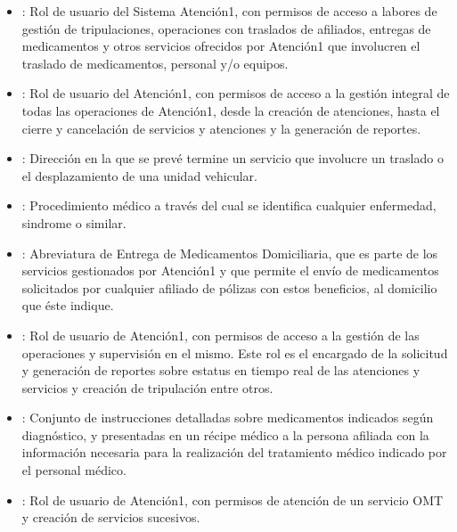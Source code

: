 \documentclass[letterpaper,10pt,spanish]{sphinxmanual}
\begin{document}
\begin{itemize}
\item {} 
: Rol de usuario del Sistema Atención\sphinxhyphen{}1, con permisos de acceso a labores de gestión de tripulaciones, operaciones con traslados de afiliados, entregas de medicamentos y otros servicios ofrecidos por Atención\sphinxhyphen{}1 que involucren el traslado de medicamentos, personal y/o equipos.

\item {} 
: Rol de usuario del Atención\sphinxhyphen{}1, con permisos de acceso a la gestión integral de todas las operaciones de Atención\sphinxhyphen{}1, desde la creación de atenciones, hasta el cierre y cancelación de servicios y atenciones y la generación de reportes.

\item {} 
: Dirección en la que se prevé termine un servicio que involucre un traslado o el desplazamiento de una unidad vehicular.

\item {} 
: Procedimiento médico a través del cual se identifica cualquier enfermedad, sindrome o similar.

\item {} 
: Abreviatura de Entrega de Medicamentos Domiciliaria, que es parte de los servicios gestionados por Atención\sphinxhyphen{}1 y que permite el envío de medicamentos solicitados por cualquier afiliado de pólizas con estos beneficios, al domicilio que éste indique.

\item {} 
: Rol de usuario de Atención\sphinxhyphen{}1, con permisos de acceso a la gestión de las operaciones y supervisión en el mismo. Este rol es el encargado de la solicitud y generación de reportes sobre estatus en tiempo real de las atenciones y servicios y creación de tripulación entre otros.

\item {} 
: Conjunto de instrucciones detalladas sobre medicamentos indicados según diagnóstico, y presentadas en un récipe médico a la persona afiliada con la información necesaria para la realización del tratamiento médico indicado por el personal médico.

\item {} 
: Rol de usuario de Atención\sphinxhyphen{}1, con permisos de atención de un servicio OMT y creación de servicios sucesivos.


\end{itemize}
\end{document}
